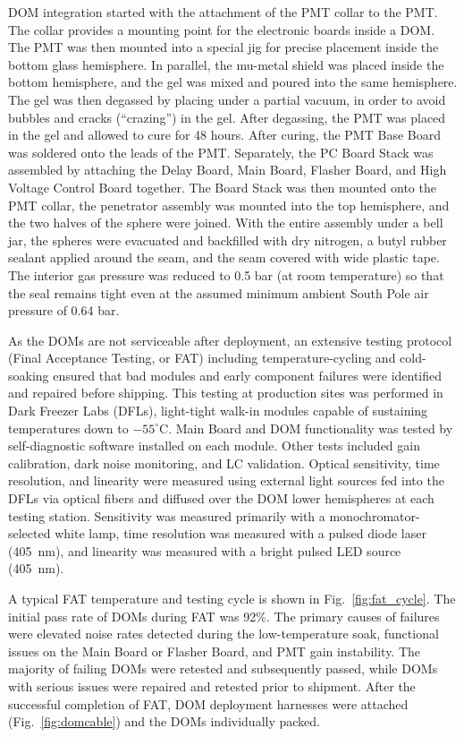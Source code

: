 DOM integration started with the attachment of the PMT collar
to the PMT.  The collar provides a mounting point for the electronic boards inside
a DOM. The PMT was then mounted into a special jig for precise
placement inside the bottom glass hemisphere.  In parallel, the mu-metal
shield was placed inside the bottom hemisphere, and the
gel was mixed and poured into the same hemisphere. The gel was then
degassed by placing under a partial vacuum, in order to avoid bubbles and
cracks (``crazing'') in the gel. 
After degassing, the PMT was placed in the gel and allowed to cure for 48
hours.  After curing, the PMT Base Board was soldered onto the leads of the
PMT.  Separately, the PC Board Stack was assembled by attaching the Delay
Board, Main Board, Flasher Board, and High Voltage Control Board together.
The Board Stack was then mounted onto the PMT collar, the penetrator assembly
was mounted into the top hemisphere, and the two halves of the sphere were
joined.  With the entire assembly under a bell jar, the spheres were
evacuated and backfilled with dry nitrogen, 
a butyl rubber sealant applied around the seam, and the seam covered with
wide plastic tape. The interior gas pressure was reduced to 0.5 bar (at
room temperature) so that the seal remains tight even at the assumed minimum
ambient South Pole air pressure of 0.64 bar.

As the DOMs are not serviceable after deployment, an extensive testing
protocol (Final Acceptance Testing, or FAT) including temperature-cycling
and cold-soaking ensured that bad modules and early component failures were
identified and repaired before shipping.  This testing at production sites
was performed in Dark Freezer Labs (DFLs), light-tight walk-in 
modules capable of sustaining temperatures down to $-55^\circ$C.  Main Board
and DOM functionality was tested by self-diagnostic software installed on
each module.  Other tests included gain calibration, dark noise monitoring,
and LC validation.  Optical sensitivity, time resolution,
and linearity were measured using external light sources fed into the DFLs
via optical fibers and diffused over the DOM lower hemispheres at each
testing station. Sensitivity was measured primarily with a
monochromator-selected white lamp, time resolution was measured with a
pulsed diode laser (405~nm), and linearity was measured with a bright
pulsed LED source (405~nm).

A typical FAT temperature and testing cycle is shown in
Fig.~\ref{fig:fat_cycle}. The initial pass rate of DOMs during FAT was
92\%.  The primary causes of failures were elevated noise rates detected during the
low-temperature soak, functional issues on the Main Board or Flasher Board,
and PMT gain instability.  The majority of failing DOMs were retested and
subsequently passed, while DOMs with serious issues were repaired and
retested prior to shipment. After the successful completion of FAT, DOM
deployment harnesses were attached (Fig.~\ref{fig:domcable}) and the DOMs individually packed. 

